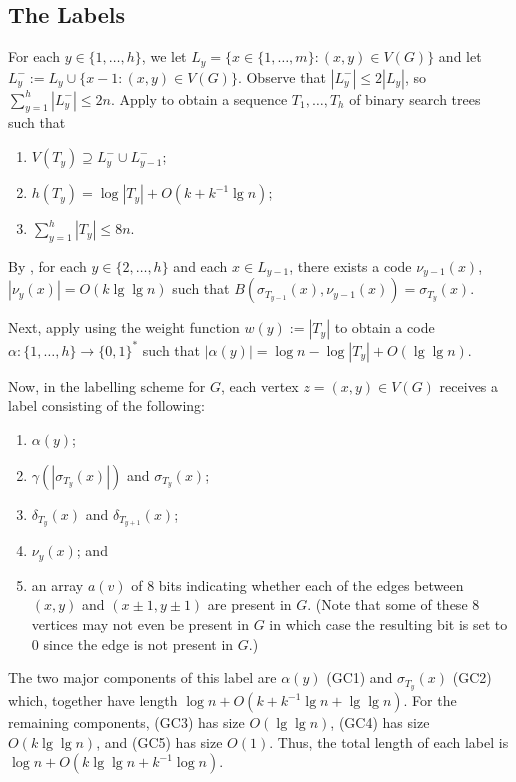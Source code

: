 \documentclass[kpfonts]{patmorin}
\begin{document}
\subsection{The Labels}

For each $y\in\{1,\ldots,h\}$, we let $L_y=\{x\in\{1,\ldots,m\}:(x,y)\in V(G)\}$ and let $L^-_y:=L_y\cup\{x-1:(x,y)\in V(G)\}$.  Observe that $|L^-_y|\le 2|L_y|$, so $\sum_{y=1}^h |L^-_y|\le 2n$.   Apply  to obtain a sequence $T_1,\ldots,T_h$ of binary search trees such that

\begin{enumerate}[(PR1)]
  \item $V(T_y)\supseteq L^-_{y}\cup L^-_{y-1}$;
  \item $h(T_y)=\log|T_y| + O(k+k^{-1}\lg n)$;
  \item $\sum_{y=1}^h|T_y| \le 8n$.
\end{enumerate}

By , for each $y\in\{2,\ldots,h\}$ and each $x\in L_{y-1}$, there exists a code $\nu_{y-1}(x)$, $|\nu_y(x)|=O(k\lg\lg n)$ such that $B(\sigma_{T_{y-1}}(x),\nu_{y-1}(x))=\sigma_{T_y}(x)$.

Next, apply  using the weight function $w(y):=|T_y|$ to obtain a code $\alpha:\{1,\ldots,h\}\to \{0,1\}^*$ such that $|\alpha(y)|=\log n - \log|T_y| + O(\lg\lg n)$.

Now, in the labelling scheme for $G$, each vertex $z=(x,y)\in V(G)$ receives a label consisting of the following:  
\begin{enumerate}[(GC1)]
  \item $\alpha(y)$;
  \item $\gamma(|\sigma_{T_y}(x)|)$ and $\sigma_{T_y}(x)$;
  \item $\delta_{T_y}(x)$ and $\delta_{T_{y+1}}(x)$;
  \item $\nu_y(x)$; and
  \item an array $a(v)$ of $8$ bits indicating whether each of the edges between $(x,y)$ and $(x\pm 1,y\pm 1)$ are present in $G$.  (Note that some of these 8 vertices may not even be present in $G$ in which case the resulting bit is set to 0 since the edge is not present in $G$.)
\end{enumerate}
The two major components of this label are $\alpha(y)$ (GC1) and $\sigma_{T_y}(x)$ (GC2) which, together have length $\log n + O(k+k^{-1}\lg n+\lg\lg n)$. For the remaining components, (GC3) has size $O(\lg\lg n)$, (GC4) has size $O(k\lg\lg n)$, and (GC5) has size $O(1)$.  Thus, the total length of each label is $\log n+ O(k\lg\lg n + k^{-1}\log n)$.  
\end{document}
